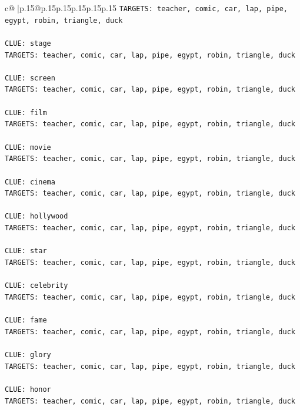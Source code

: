 \documentclass{article}
\begin{document}
{\begin{supertabular}{c@{$\;$}|p{.15\linewidth}@{}p{.15\linewidth}p{.15\linewidth}p{.15\linewidth}p{.15\linewidth}p{.15\linewidth}}
{{{\texttt{TARGETS: teacher, comic, car, lap, pipe, egypt, robin, triangle, duck} \\
\\ 
\texttt{CLUE: stage} \\
\texttt{TARGETS: teacher, comic, car, lap, pipe, egypt, robin, triangle, duck} \\
\\ 
\texttt{CLUE: screen} \\
\texttt{TARGETS: teacher, comic, car, lap, pipe, egypt, robin, triangle, duck} \\
\\ 
\texttt{CLUE: film} \\
\texttt{TARGETS: teacher, comic, car, lap, pipe, egypt, robin, triangle, duck} \\
\\ 
\texttt{CLUE: movie} \\
\texttt{TARGETS: teacher, comic, car, lap, pipe, egypt, robin, triangle, duck} \\
\\ 
\texttt{CLUE: cinema} \\
\texttt{TARGETS: teacher, comic, car, lap, pipe, egypt, robin, triangle, duck} \\
\\ 
\texttt{CLUE: hollywood} \\
\texttt{TARGETS: teacher, comic, car, lap, pipe, egypt, robin, triangle, duck} \\
\\ 
\texttt{CLUE: star} \\
\texttt{TARGETS: teacher, comic, car, lap, pipe, egypt, robin, triangle, duck} \\
\\ 
\texttt{CLUE: celebrity} \\
\texttt{TARGETS: teacher, comic, car, lap, pipe, egypt, robin, triangle, duck} \\
\\ 
\texttt{CLUE: fame} \\
\texttt{TARGETS: teacher, comic, car, lap, pipe, egypt, robin, triangle, duck} \\
\\ 
\texttt{CLUE: glory} \\
\texttt{TARGETS: teacher, comic, car, lap, pipe, egypt, robin, triangle, duck} \\
\\ 
\texttt{CLUE: honor} \\
\texttt{TARGETS: teacher, comic, car, lap, pipe, egypt, robin, triangle, duck} \\
}}}
\end{supertabular}}
\end{document}
